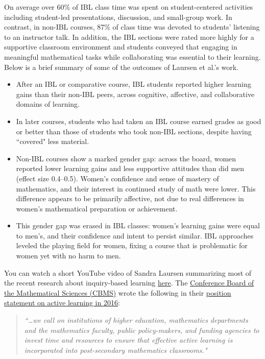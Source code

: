 \documentclass[11pt]{article}%
\begin{document}
On average over 60\% of IBL class time was spent on student-centered activities including student-led presentations, discussion, and small-group work. In contrast, in non-IBL courses, 87\% of class time was devoted to students' listening to an instructor talk. In addition, the IBL sections were rated more highly for a supportive classroom environment and students conveyed that engaging in meaningful mathematical tasks while collaborating was essential to their learning. Below is a brief summary of some of the outcomes of Laursen et al.'s work.
\begin{itemize}
\item After an IBL or comparative course, IBL students reported higher learning gains than their non-IBL peers, across cognitive, affective, and collaborative domains of learning.
\item In later courses, students who had taken an IBL course earned grades as good or better than those of students who took non-IBL sections, despite having ``covered" less material.
\item Non-IBL courses show a marked gender gap: across the board, women reported lower learning gains and less supportive attitudes than did men (effect size 0.4--0.5). Women's confidence and sense of mastery of mathematics, and their interest in continued study of math were lower. This difference appears to be primarily affective, not due to real differences in women's mathematical preparation or achievement.
\item This gender gap was erased in IBL classes: women's learning gains were equal to men's, and their confidence and intent to persist similar. IBL approaches leveled the playing field for women, fixing a course that is problematic for women yet with no harm to men.
\end{itemize}

You can watch a short YouTube video of Sandra Laursen summarizing most of the recent research about inquiry-based learning \href{https://www.youtube.com/watch?v=m_HK6b3RGOc&feature=youtu.be}{here}. The \href{https://www.cbmsweb.org}{Conference Board of the Mathematical Sciences (CBMS)} wrote the following in their \href{https://www.cbmsweb.org/2016/07/active-learning-in-post-secondary-mathematics-education/}{position statement on active learning in 2016}:

\begin{quote}
\emph{``\ldots we call on institutions of higher education, mathematics departments and the mathematics faculty, public policy-makers, and funding agencies to invest time and resources to ensure that effective active learning is incorporated into post-secondary mathematics classrooms."}
\end{quote}
\end{document}
